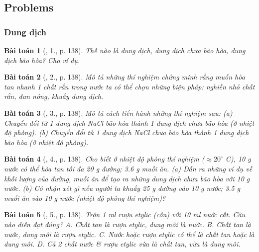 \documentclass{article}
\newtheorem{baitoan}{Bài toán}
\begin{document}
\newpage
\subsection{Problems}

\subsubsection{Dung dịch}

\begin{baitoan}[\cite{SGK_Hoa_Hoc_8}, 1., p. 138]
	Thế nào là dung dịch, dung dịch chưa bão hòa, dung dịch bão hòa? Cho ví dụ.
\end{baitoan}

\begin{baitoan}[\cite{SGK_Hoa_Hoc_8}, 2., p. 138]
	Mô tả những thí nghiệm chứng minh rằng muốn hòa tan nhanh 1 chất rắn trong nước ta có thể chọn những biện pháp: nghiền nhỏ chất rắn, đun nóng, khuấy dung dịch.
\end{baitoan}	

\begin{baitoan}[\cite{SGK_Hoa_Hoc_8}, 3., p. 138]
	Mô tả cách tiến hành những thí nghiệm sau: (a) Chuyển đổi từ 1 dung dịch \emph{NaCl} bão hòa thành 1 dung dịch chưa bão hòa (ở nhiệt độ phòng). (b) Chuyển đổi từ 1 dung dịch \emph{NaCl} chưa bão hòa thành 1 dung dịch bão hòa (ở nhiệt độ phòng).
\end{baitoan}

\begin{baitoan}[\cite{SGK_Hoa_Hoc_8}, 4., p. 138]
	Cho biết ở nhiệt độ phòng thí nghiệm ($\approx20^\circ$ C), \emph{10 g} nước có thể hòa tan tối đa \emph{20 g} đường; \emph{3.6 g} muối ăn. (a) Dẫn ra những ví dụ về khối lượng của đường, muối ăn để tạo ra những dung dịch chưa bão hòa với \emph{10 g} nước. (b) Có nhận xét gì nếu người ta khuấy \emph{25 g} đường vào \emph{10 g} nước; \emph{3.5 g} muối ăn vào \emph{10 g} nước (nhiệt độ phòng thí nghiệm)?
\end{baitoan}

\begin{baitoan}[\cite{SGK_Hoa_Hoc_8}, 5., p. 138]
	Trộn \emph{1 ml} rượu etylic (cồn) với \emph{10 ml} nước cất. Câu nào diễn đạt đúng? {\sf A.} Chất tan là rượu etylic, dung môi là nước. {\sf B.} Chất tan là nước, dung môi là rượu etylic. {\sf C.} Nước hoặc rượu etylic có thể là chất tan hoặc là dung môi. {\sf D.} Cả 2 chất nước \& rượu etylic vừa là chất tan, vừa là dung môi.
\end{baitoan}
\end{document}
